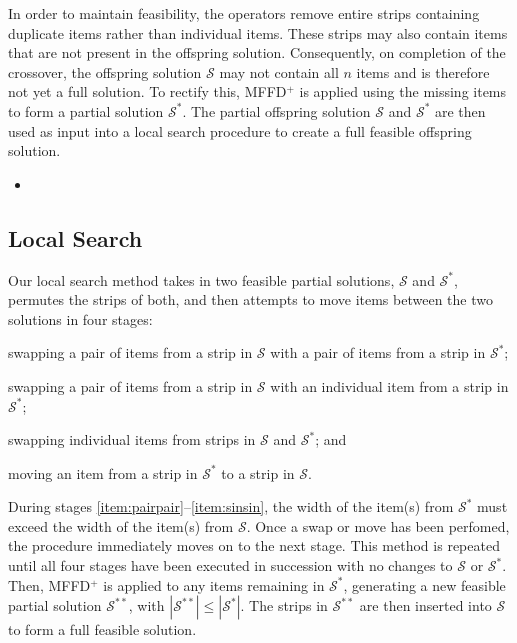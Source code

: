 \documentclass{elsarticle}
\begin{document}
In order to maintain feasibility, the operators remove entire strips containing duplicate items rather than individual items. These strips may also contain items that are not present in the offspring solution. Consequently, on completion of the crossover, the offspring solution $\mathcal{S}$ may not contain all $n$ items and is therefore not yet a full solution. To rectify this, MFFD$^+$ is applied using the missing items to form a partial solution $\mathcal{S}^*$. The partial offspring solution $\mathcal{S}$ and $\mathcal{S}^*$ are then used as input into a local search procedure to create a full feasible offspring solution.

{\color{myRed}
\begin{itemize}[leftmargin=*]
	\item
\end{itemize}
}

\subsection{Local Search}
\label{sub:localsearch}
\noindent Our local search method takes in two feasible partial solutions, $\mathcal{S}$ and $\mathcal{S}^*$, permutes the strips of both, and then attempts to move items between the two solutions in four stages: 
\begin{enumerate*}[label={(\roman*)}]
	\item swapping a pair of items from a strip in $\mathcal{S}$ with a pair of items from a strip in $\mathcal{S}^*$;\label{item:pairpair}
	\item swapping a pair of items from a strip in $\mathcal{S}$ with an individual item from a strip in $\mathcal{S}^*$;\label{item:pairsin}
	\item swapping individual items from strips in $\mathcal{S}$ and $\mathcal{S}^*$;\label{item:sinsin} and
	\item moving an item from a strip in $\mathcal{S}^*$ to a strip in $\mathcal{S}$.\label{item:movesin}
\end{enumerate*} 
During stages \ref{item:pairpair}--\ref{item:sinsin}, the width of the item(s) from $\mathcal{S}^*$ must exceed the width of the item(s) from $\mathcal{S}$. Once a swap or move has been perfomed, the procedure immediately moves on to the next stage. This method is repeated until all four stages have been executed in succession with no changes to $\mathcal{S}$ or $\mathcal{S}^*$. Then, MFFD$^+$ is applied to any items remaining in $\mathcal{S}^*$, generating a new feasible partial solution $\mathcal{S}^{**}$, with $|\mathcal{S}^{**}| \leq |\mathcal{S}^*|$. The strips in $\mathcal{S}^{**}$ are then inserted into $\mathcal{S}$ to form a full feasible solution.
\end{document}
